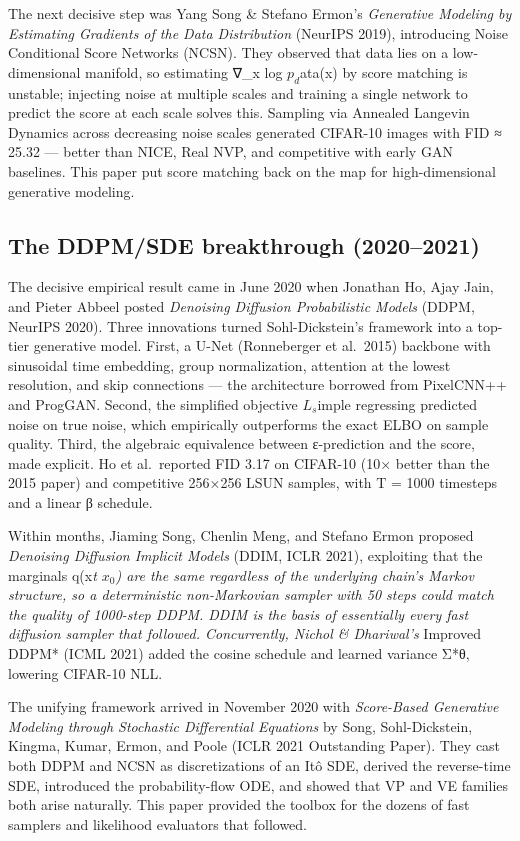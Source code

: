 The next decisive step was Yang Song \& Stefano Ermon's \emph{Generative Modeling by Estimating Gradients of the Data Distribution} (NeurIPS 2019), introducing Noise Conditional Score Networks (NCSN). They observed that data lies on a low-dimensional manifold, so estimating ∇\_x log \(p_d\)ata(x) by score matching is unstable; injecting noise at multiple scales and training a single network to predict the score at each scale solves this. Sampling via Annealed Langevin Dynamics across decreasing noise scales generated CIFAR-10 images with FID ≈ 25.32 --- better than NICE, Real NVP, and competitive with early GAN baselines. This paper put score matching back on the map for high-dimensional generative modeling.

\subsection{The DDPM/SDE breakthrough (2020--2021)}\label{the-ddpmsde-breakthrough-20202021}

The decisive empirical result came in June 2020 when Jonathan Ho, Ajay Jain, and Pieter Abbeel posted \emph{Denoising Diffusion Probabilistic Models} (DDPM, NeurIPS 2020). Three innovations turned Sohl-Dickstein's framework into a top-tier generative model. First, a U-Net (Ronneberger et al.~2015) backbone with sinusoidal time embedding, group normalization, attention at the lowest resolution, and skip connections --- the architecture borrowed from PixelCNN++ and ProgGAN. Second, the simplified objective \(L_s\)imple regressing predicted noise on true noise, which empirically outperforms the exact ELBO on sample quality. Third, the algebraic equivalence between ε-prediction and the score, made explicit. Ho et al.~reported FID 3.17 on CIFAR-10 (10× better than the 2015 paper) and competitive 256×256 LSUN samples, with T = 1000 timesteps and a linear β schedule.

Within months, Jiaming Song, Chenlin Meng, and Stefano Ermon proposed \emph{Denoising Diffusion Implicit Models} (DDIM, ICLR 2021), exploiting that the marginals q(x\emph{t \textbar{} \(x_0\)) are the same regardless of the underlying chain's Markov structure, so a deterministic non-Markovian sampler with 50 steps could match the quality of 1000-step DDPM. DDIM is the basis of essentially every fast diffusion sampler that followed. Concurrently, Nichol \& Dhariwal's }Improved DDPM* (ICML 2021) added the cosine schedule and learned variance Σ*θ, lowering CIFAR-10 NLL.

The unifying framework arrived in November 2020 with \emph{Score-Based Generative Modeling through Stochastic Differential Equations} by Song, Sohl-Dickstein, Kingma, Kumar, Ermon, and Poole (ICLR 2021 Outstanding Paper). They cast both DDPM and NCSN as discretizations of an Itô SDE, derived the reverse-time SDE, introduced the probability-flow ODE, and showed that VP and VE families both arise naturally. This paper provided the toolbox for the dozens of fast samplers and likelihood evaluators that followed.

